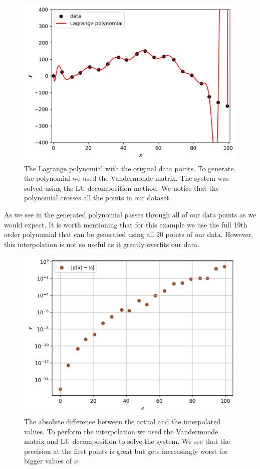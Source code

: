 \documentclass[a4paper,10pt]{article}
\begin{document}
\begin{figure}[H]
  \centering
  \includegraphics[width=0.75\linewidth]{./plots/vander_pol.png}
  \caption{The Lagrange polynomial with the original data points. To generate the polynomial we used the Vandermonde matrix. The system was solved using the LU decomposition method. We notice that the polynomial crosses all the points in our dataset.}
  \label{fig:van_pol}
\end{figure}

As we see in  the generated polynomial passes through all of our data points as we would expect. It is worth mentioning that for this example we use the full 19th order polynomial that can be generated using all 20 points of our data. However, this interpolation is not so useful as it greatly overfits our data. 

\begin{figure}[H]
  \centering
  \includegraphics[width=0.75\linewidth]{./plots/vander_dif.png}
  \caption{The absolute difference between the actual and the interpolated values. To perform the interpolation we used the Vandermonde matrix and LU decomposition to solve the system. We see that the precision at the first points is great but gets increasingly worst for bigger values of $x$.}
  \label{fig:van_dif}
\end{figure}
\end{document}
